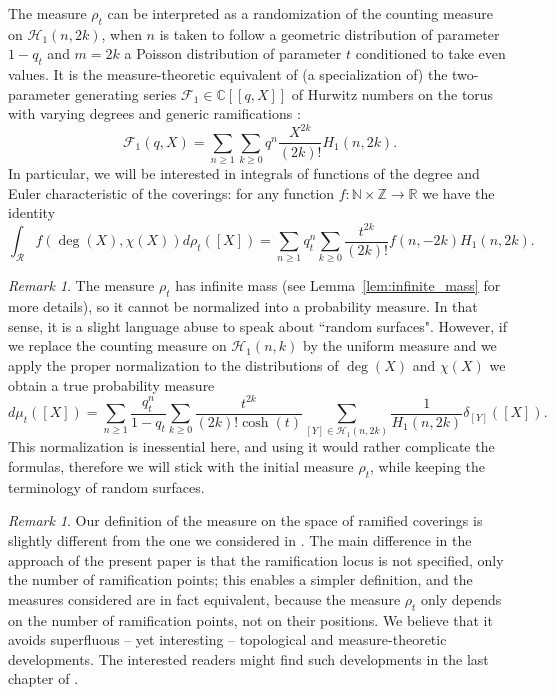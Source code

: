 \documentclass[11pt,a4paper,reqno]{article}
\theoremstyle{definition}
\theoremstyle{remark}
\newtheorem{remark}[theorem]{Remark}
\newcommand\Z{{\mathbb Z}}
\newcommand\N{{\mathbb N}}
\newcommand\R{\mathbb{R}}
\newcommand\C{\mathbb{C}}
\begin{document}
The measure $\rho_t$ can be interpreted as a randomization of the counting measure on $\mathcal{H}_1(n,2k)$, when $n$ is taken to follow a geometric distribution of parameter $1-q_t$ and $m=2k$ a Poisson distribution of parameter $t$ conditioned to take even values. It is the measure-theoretic equivalent of (a specialization of) the two-parameter generating series $\mathcal{F}_1\in\C[[q,X]]$ of Hurwitz numbers on the torus with varying degrees and generic ramifications \cite{LZ}:
\[
\mathcal{F}_1(q,X)=\sum_{n\geq 1}\sum_{k\geq 0}q^n\frac{X^{2k}}{(2k)!}H_1(n,2k).
\]
In particular, we will be interested in integrals of functions of the degree and Euler characteristic of the coverings: for any function $f:\N\times\Z\to\R$ we have the identity
\begin{equation}\label{eq:conversion_integral_Hurwitz}
\int_{\mathcal{R}}f(\deg(X),\chi(X))d\rho_t([X])=\sum_{n\geq 1}q_t^n\sum_{k\geq 0}\frac{t^{2k}}{(2k)!}f(n,-2k)H_1(n,2k).
\end{equation}

\begin{remark}
The measure $\rho_t$ has infinite mass (see Lemma~\ref{lem:infinite_mass} for more details), so it cannot be normalized into a probability measure. In that sense, it is a slight language abuse to speak about ``random surfaces". However, if we replace the counting measure on $\mathcal{H}_1(n,k)$ by the uniform measure and we apply the proper normalization to the distributions of $\deg(X)$ and $\chi(X)$ we obtain a true probability measure
\[
d\mu_t([X])=\sum_{n\geq 1}\frac{q_t^n}{1-q_t}\sum_{k\geq 0}\frac{t^{2k}}{(2k)!\cosh(t)}\sum_{[Y]\in\mathcal{H}_1(n,2k)}\frac{1}{H_1(n,2k)}\delta_{[Y]}([X]).
\]
This normalization is inessential here, and using it would rather complicate the formulas, therefore we will stick with the initial measure $\rho_t$, while keeping the terminology of random surfaces.
\end{remark}


\begin{remark}
Our definition of the measure on the space of ramified coverings is slightly different from the one we considered in \cite{LM2}. The main difference in the approach of the present paper is that the ramification locus is not specified, only the number of ramification points; this enables a simpler definition, and the measures considered are in fact equivalent, because the measure $\rho_t$ only depends on the number of ramification points, not on their positions. We believe that it avoids superfluous -- yet interesting -- topological and measure-theoretic developments. The interested readers might find such developments in the last chapter of \cite{Lev10}.
\end{remark}
\end{document}
